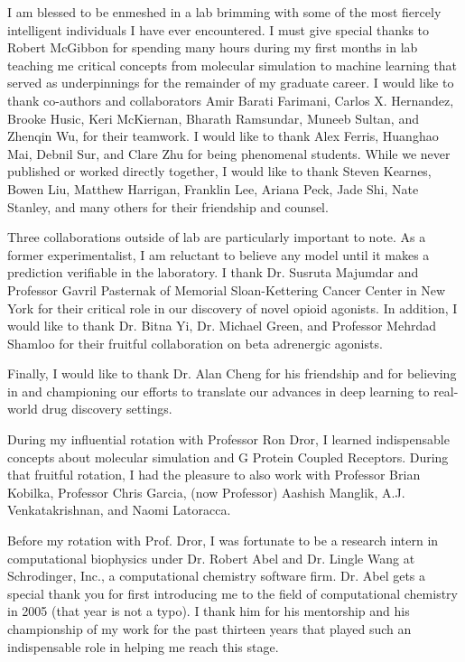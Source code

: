 \begin{acknowledgments}
I am blessed to be enmeshed in a lab brimming with some of the most fiercely intelligent individuals I have ever encountered. I must give special thanks to Robert McGibbon for spending many hours during my first months in lab teaching me critical concepts from molecular simulation to machine learning that served as underpinnings for the remainder of my graduate career. I would like to thank co-authors and collaborators Amir Barati Farimani, Carlos X. Hernandez, Brooke Husic, Keri McKiernan, Bharath Ramsundar, Muneeb Sultan, and Zhenqin Wu, for their teamwork. I would like to thank Alex Ferris, Huanghao Mai, Debnil Sur, and Clare Zhu for being phenomenal students. While we never published or worked directly together, I would like to thank Steven Kearnes, Bowen Liu, Matthew Harrigan, Franklin Lee, Ariana Peck, Jade Shi, Nate Stanley, and many others for their friendship and counsel.

Three collaborations outside of lab are particularly important to note. As a former experimentalist, I am reluctant to believe any model until it makes a prediction verifiable in the laboratory. I thank Dr. Susruta Majumdar and Professor Gavril Pasternak of Memorial Sloan-Kettering Cancer Center in New York for their critical role in our discovery of novel opioid agonists. In addition, I would like to thank Dr. Bitna Yi, Dr. Michael Green, and Professor Mehrdad Shamloo for their fruitful collaboration on beta adrenergic agonists.

Finally, I would like to thank Dr. Alan Cheng for his friendship and for believing in and championing our efforts to translate our advances in deep learning to real-world drug discovery settings.

During my influential rotation with Professor Ron Dror, I learned indispensable concepts about molecular simulation and G Protein Coupled Receptors. During that fruitful rotation, I had the pleasure to also work with Professor Brian Kobilka, Professor Chris Garcia, (now Professor) Aashish Manglik, A.J. Venkatakrishnan, and Naomi Latoracca.

Before my rotation with Prof. Dror, I was fortunate to be a research intern in computational biophysics under Dr. Robert Abel and Dr. Lingle Wang at Schrodinger, Inc., a computational chemistry software firm. Dr. Abel gets a special thank you for first introducing me to the field of computational chemistry in 2005 (that year is not a typo). I thank him for his mentorship and his championship of my work for the past thirteen years that played such an indispensable role in helping me reach this stage.


\end{acknowledgments}
